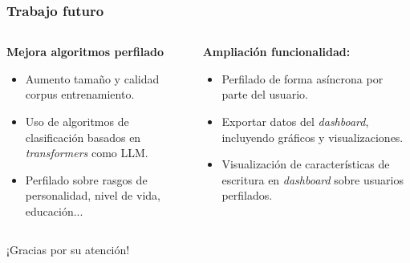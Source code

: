 \documentclass{beamer}
\begin{document}
	\begin{frame}
		\frametitle{Trabajo futuro}
		\vspace{-2cm}
		\vspace{1cm}
		\begin{columns}[T]
			\hspace{-3.5cm}

			\begin{column}{0.8\textwidth}
			\vspace{-1cm}
				\begin{description}[labelwidth=0.01mm]
					\item \textbf{Mejora algoritmos perfilado}
					\begin{itemize}
						\item Aumento tamaño y calidad corpus entrenamiento. \pause
						\item Uso de algoritmos de clasificación basados en \textit{transformers} como LLM. \pause
						\item Perfilado sobre rasgos de personalidad, nivel de vida, educación...
						
						\end{itemize}
				\end{description}
			\end{column}
			\hspace{-3.5cm}

			\begin{column}{0.8\textwidth}
							\vspace{-1cm}
				\begin{description}[labelwidth=0.01mm]
					\item \textbf{Ampliación funcionalidad:}
					\begin{itemize}
						\item Perfilado de forma asíncrona por parte del usuario. \pause
						\item Exportar datos del \textit{dashboard}, incluyendo gráficos y visualizaciones.\pause
						\item Visualización de características de escritura en \textit{dashboard} sobre usuarios perfilados.
						
					\end{itemize}
				\end{description}
			\end{column}
		\end{columns}
	\end{frame}
	
\begin{frame}[plain]
	\begin{center}
		\Huge ¡Gracias por su atención!
	\end{center}
\end{frame}
\end{document}
